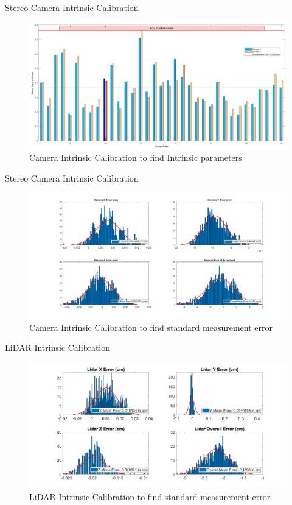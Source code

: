 \documentclass[10pt]{beamer}
\begin{document}
\begin{frame}{Stereo Camera Intrinsic Calibration}
    \begin{figure}
        \centering
        \includegraphics[width=1\textwidth]{Images/camintrinsic1.png}
        \caption{Camera Intrinsic Calibration to find Intrinsic parameters}
    \end{figure}
\end{frame}

\begin{frame}{Stereo Camera Intrinsic Calibration}
    \begin{figure}
        \centering
        \includegraphics[width=1\textwidth]{Images/Cam_intrinsic.png}
        \caption{Camera Intrinsic Calibration to find standard measurement error}
    \end{figure}
\end{frame}

\begin{frame}{LiDAR Intrinsic Calibration}
    \begin{figure}
        \centering
        \includegraphics[width=1\textwidth]{Images/Lidar_Intrinsic.png}
        \caption{LiDAR Intrinsic Calibration to find standard measurement error}
    \end{figure}
\end{frame}
\end{document}
